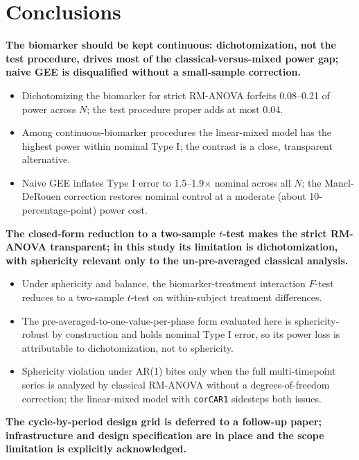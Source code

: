 \documentclass[
  11pt,
]{article}
\begin{document}
\section{Conclusions}\label{conclusions}

\textbf{The biomarker should be kept continuous: dichotomization, not the test procedure, drives most of the classical-versus-mixed power gap; naive GEE is disqualified without a small-sample correction.}

\begin{itemize}\setlength{\itemsep}{2pt}\setlength{\parskip}{0pt}
\item Dichotomizing the biomarker for strict RM-ANOVA forfeits 0.08--0.21 of power across $N$; the test procedure proper adds at most 0.04.
\item Among continuous-biomarker procedures the linear-mixed model has the highest power within nominal Type I; the contrast is a close, transparent alternative.
\item Naive GEE inflates Type I error to 1.5--1.9$\times$ nominal across all $N$; the Mancl-DeRouen correction restores nominal control at a moderate (about 10-percentage-point) power cost.
\end{itemize}

\textbf{The closed-form reduction to a two-sample $t$-test makes the strict RM-ANOVA transparent; in this study its limitation is dichotomization, with sphericity relevant only to the un-pre-averaged classical analysis.}

\begin{itemize}\setlength{\itemsep}{2pt}\setlength{\parskip}{0pt}
\item Under sphericity and balance, the biomarker-treatment interaction $F$-test reduces to a two-sample $t$-test on within-subject treatment differences.
\item The pre-averaged-to-one-value-per-phase form evaluated here is sphericity-robust by construction and holds nominal Type I error, so its power loss is attributable to dichotomization, not to sphericity.
\item Sphericity violation under AR(1) bites only when the full multi-timepoint series is analyzed by classical RM-ANOVA without a degrees-of-freedom correction; the linear-mixed model with \texttt{corCAR1} sidesteps both issues.
\end{itemize}

\textbf{The cycle-by-period design grid is deferred to a follow-up paper; infrastructure and design specification are in place and the scope limitation is explicitly acknowledged.}
\end{document}
